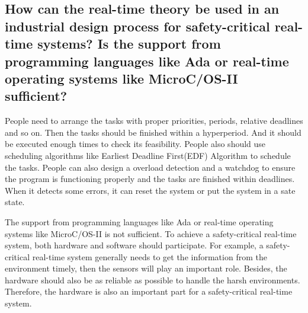 \documentclass[10pt]{article}
\begin{document}
\subsection{How can the real-time theory be used in an industrial design process for safety-critical real-time systems? Is the support from programming languages like Ada or real-time operating systems like MicroC/OS-II sufficient?}

People need to arrange the tasks with proper priorities, periods, relative deadlines and so on. Then the tasks should be finished within a hyperperiod. And it should be executed enough times to check its feasibility. People also should use scheduling algorithms like Earliest Deadline First(EDF) Algorithm to schedule the tasks. People can also design a overload detection and a watchdog to ensure the program is functioning properly and the tasks are finished within deadlines. When it detects some errors, it can reset the system or put the system in a sate state.

The support from programming languages like Ada or real-time operating systems like MicroC/OS-II is not sufficient. To achieve a safety-critical real-time system, both hardware and software should participate. For example, a safety-critical real-time system generally needs to get the information from the environment timely, then the sensors will play an important role. Besides, the hardware should also be as reliable as possible to handle the harsh environments. Therefore, the hardware is also an important part for a safety-critical real-time system.
\end{document}
